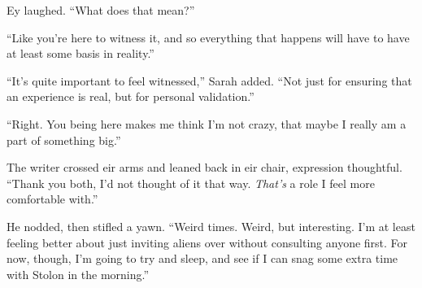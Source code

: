 Ey laughed. ``What does that mean?''

``Like you're here to witness it, and so everything that happens will have to have at least some basis in reality.''

``It's quite important to feel witnessed,'' Sarah added. ``Not just for ensuring that an experience is real, but for personal validation.''

``Right. You being here makes me think I'm not crazy, that maybe I really am a part of something big.''

The writer crossed eir arms and leaned back in eir chair, expression thoughtful. ``Thank you both, I'd not thought of it that way. \emph{That's} a role I feel more comfortable with.''

He nodded, then stifled a yawn. ``Weird times. Weird, but interesting. I'm at least feeling better about just inviting aliens over without consulting anyone first. For now, though, I'm going to try and sleep, and see if I can snag some extra time with Stolon in the morning.''
